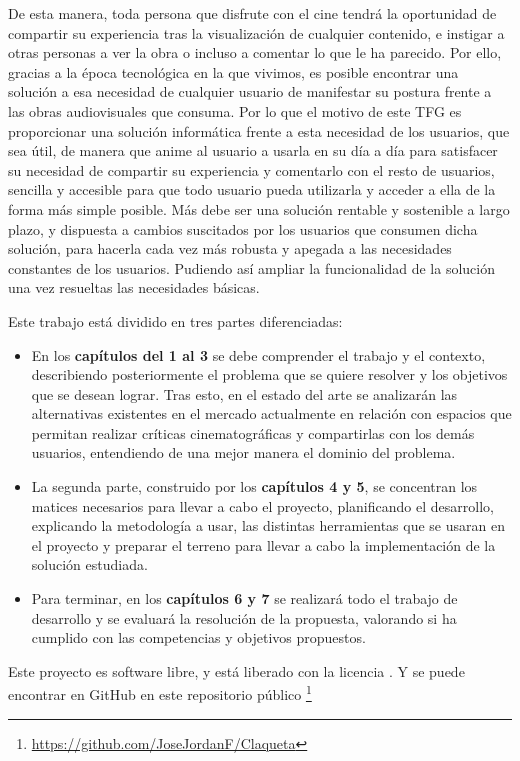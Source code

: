 De esta manera, toda persona que disfrute con el cine tendrá la oportunidad de compartir su experiencia tras la visualización de cualquier contenido, e instigar a otras personas a ver la obra o incluso a comentar lo que le ha parecido. Por ello, gracias a la época tecnológica en la que vivimos, es posible encontrar una solución a esa necesidad de cualquier usuario de manifestar su postura frente a las obras audiovisuales que consuma. Por lo que el motivo de este TFG es proporcionar una solución informática frente a esta necesidad de los usuarios, que sea útil, de manera que anime al usuario a usarla en su día a día para satisfacer su necesidad de compartir su experiencia y comentarlo con el resto de usuarios, sencilla y accesible para que todo usuario pueda utilizarla y acceder a ella de la forma más simple posible. Más debe ser una solución rentable y sostenible a largo plazo, y dispuesta a cambios suscitados por los usuarios que consumen dicha solución, para hacerla cada vez más robusta y apegada a las necesidades constantes de los usuarios. Pudiendo así ampliar la funcionalidad de la solución una vez resueltas las necesidades básicas.

Este trabajo está dividido en tres partes diferenciadas:
\begin{itemize}
    \item En los \textbf{capítulos del 1 al 3} se debe comprender el trabajo y el contexto, describiendo posteriormente el problema que se quiere resolver y los objetivos que se desean lograr. Tras esto, en el estado del arte se analizarán las alternativas existentes en el mercado actualmente en relación con espacios que permitan realizar críticas cinematográficas y compartirlas con los demás usuarios, entendiendo de una mejor manera el dominio del problema.
    \item La segunda parte, construido por los \textbf{capítulos 4 y 5}, se concentran los matices necesarios para llevar a cabo el proyecto, planificando el desarrollo, explicando la metodología a usar, las distintas herramientas que se usaran en el proyecto y preparar el terreno para llevar a cabo la implementación de la solución estudiada.
    \item Para terminar, en los \textbf{capítulos 6 y 7} se realizará todo el trabajo de desarrollo y se evaluará la resolución de la propuesta, valorando si ha cumplido con las competencias y objetivos propuestos.
\end{itemize}

Este proyecto es software libre, y está liberado con la licencia \cite{gplv3}. Y se puede encontrar en GitHub en este repositorio público \footnote{\url{https://github.com/JoseJordanF/Claqueta}}